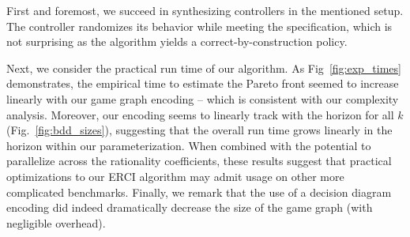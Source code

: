 
 First and foremost, we succeed in synthesizing
controllers in the mentioned setup.  The controller randomizes its
behavior while meeting the specification, which is not surprising as
the algorithm yields a correct-by-construction policy.

Next, we consider the practical run time of our algorithm.  As
Fig~\ref{fig:exp_times} demonstrates, the empirical time to estimate
the Pareto front seemed to increase linearly with our game graph
encoding -- which is consistent with our complexity analysis.
Moreover, our encoding seems to linearly track with the horizon for
all $k$ (Fig.~\ref{fig:bdd_sizes}), suggesting that the overall run
time grows linearly in the horizon within our parameterization. When
combined with the potential to parallelize across the rationality
coefficients, these results suggest that practical optimizations to
our ERCI algorithm may admit usage on other more complicated
benchmarks. Finally, we remark that the use of a decision diagram
encoding did indeed dramatically decrease the size of the game graph
(with negligible overhead).\footnotemark








